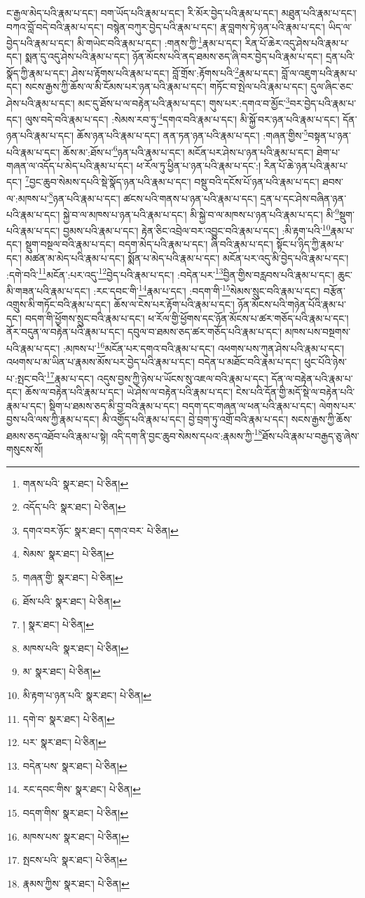 ང་རྒྱལ་མེད་པའི་རྣམ་པ་དང་། བག་ཡོད་པའི་རྣམ་པ་དང་། རི་མོར་བྱེད་པའི་རྣམ་པ་དང་། མཐུན་པའི་རྣམ་པ་དང་། བཀའ་བློ་བདེ་བའི་རྣམ་པ་དང་། བསྙེན་བཀུར་བྱེད་པའི་རྣམ་པ་དང་། རྣ་བླགས་ཏེ་ཉན་པའི་རྣམ་པ་དང་། ཡིད་ལ་བྱེད་པའི་རྣམ་པ་དང་། མི་གཡེང་བའི་རྣམ་པ་དང་། :གནས་ཀྱི་\footnote{གནས་པའི་  སྣར་ཐང་།  པེ་ཅིན། }རྣམ་པ་དང་། རིན་པོ་ཆེར་འདུ་ཤེས་པའི་རྣམ་པ་དང་། སྨན་དུ་འདུ་ཤེས་པའི་རྣམ་པ་དང་། ཉོན་མོངས་པའི་ནད་ཐམས་ཅད་ཞི་བར་བྱེད་པའི་རྣམ་པ་དང་། དྲན་པའི་སྣོད་ཀྱི་རྣམ་པ་དང་། ཤེས་པ་རྟོགས་པའི་རྣམ་པ་དང་། བློ་གྲོས་:རྟོགས་པའི་\footnote{འདོད་པའི་  སྣར་ཐང་།  པེ་ཅིན། }རྣམ་པ་དང་། བློ་ལ་འཇུག་པའི་རྣམ་པ་དང་། སངས་རྒྱས་ཀྱི་ཆོས་ལ་མི་ངོམས་པར་ཉན་པའི་རྣམ་པ་དང་། གཏོང་བ་སྤེལ་པའི་རྣམ་པ་དང་། དུལ་ཞིང་ཅང་ཤེས་པའི་རྣམ་པ་དང་། མང་དུ་ཐོས་པ་ལ་བརྟེན་པའི་རྣམ་པ་དང་། གུས་པར་:དགའ་བ་མྱོང་\footnote{དགའ་བར་ཉོང་  སྣར་ཐང་། དགའ་བར་  པེ་ཅིན། }བར་བྱེད་པའི་རྣམ་པ་དང་། ལུས་བདེ་བའི་རྣམ་པ་དང་། :སེམས་རབ་ཏུ་\footnote{སེམས་  སྣར་ཐང་།  པེ་ཅིན། }དགའ་བའི་རྣམ་པ་དང་། མི་སྐྱོ་བར་ཉན་པའི་རྣམ་པ་དང་། དོན་ཉན་པའི་རྣམ་པ་དང་། ཆོས་ཉན་པའི་རྣམ་པ་དང་། ནན་ཏན་ཉན་པའི་རྣམ་པ་དང་། :གཞན་གྱིས་\footnote{གཞན་གྱི་  སྣར་ཐང་།  པེ་ཅིན། }བསྟན་པ་ཉན་པའི་རྣམ་པ་དང་། ཆོས་མ་:ཐོས་པ་\footnote{ཐོས་པའི་  སྣར་ཐང་།  པེ་ཅིན། }ཉན་པའི་རྣམ་པ་དང་། མངོན་པར་ཤེས་པ་ཉན་པའི་རྣམ་པ་དང་། ཐེག་པ་གཞན་ལ་འདོད་པ་མེད་པའི་རྣམ་པ་དང་། ཕ་རོལ་ཏུ་ཕྱིན་པ་ཉན་པའི་རྣམ་པ་དང་:། རིན་པོ་ཆེ་ཉན་པའི་རྣམ་པ་དང་། \footnote{།    སྣར་ཐང་།  པེ་ཅིན། }བྱང་ཆུབ་སེམས་དཔའི་སྡེ་སྣོད་ཉན་པའི་རྣམ་པ་དང་། བསྡུ་བའི་དངོས་པོ་ཉན་པའི་རྣམ་པ་དང་། ཐབས་ལ་:མཁས་པ་\footnote{མཁས་པའི་  སྣར་ཐང་།  པེ་ཅིན། }ཉན་པའི་རྣམ་པ་དང་། ཚངས་པའི་གནས་པ་ཉན་པའི་རྣམ་པ་དང་། དྲན་པ་དང་ཤེས་བཞིན་ཉན་པའི་རྣམ་པ་དང་། སྐྱེ་བ་ལ་མཁས་པ་ཉན་པའི་རྣམ་པ་དང་། མི་སྐྱེ་བ་ལ་མཁས་པ་ཉན་པའི་རྣམ་པ་དང་། མི་\footnote{མ་  སྣར་ཐང་།  པེ་ཅིན། }སྡུག་པའི་རྣམ་པ་དང་། བྱམས་པའི་རྣམ་པ་དང་། རྟེན་ཅིང་འབྲེལ་བར་འབྱུང་བའི་རྣམ་པ་དང་། :མི་རྟག་པའི་\footnote{མི་རྟག་པ་ཉན་པའི་  སྣར་ཐང་།  པེ་ཅིན། }རྣམ་པ་དང་། སྡུག་བསྔལ་བའི་རྣམ་པ་དང་། བདག་མེད་པའི་རྣམ་པ་དང་། ཞི་བའི་རྣམ་པ་དང་། སྟོང་པ་ཉིད་ཀྱི་རྣམ་པ་དང་། མཚན་མ་མེད་པའི་རྣམ་པ་དང་། སྨོན་པ་མེད་པའི་རྣམ་པ་དང་། མངོན་པར་འདུ་མི་བྱེད་པའི་རྣམ་པ་དང་། :དགེ་བའི་\footnote{དགེ་བ་  སྣར་ཐང་།  པེ་ཅིན། }མངོན་:པར་འདུ་\footnote{པར་  སྣར་ཐང་།  པེ་ཅིན། }བྱེད་པའི་རྣམ་པ་དང་། :བདེན་པར་\footnote{བདེན་པས་  སྣར་ཐང་།  པེ་ཅིན། }བྱིན་གྱིས་བརླབས་པའི་རྣམ་པ་དང་། ཆུང་མི་གཟན་པའི་རྣམ་པ་དང་། :རང་དབང་གི་\footnote{རང་དབང་གིས་  སྣར་ཐང་།  པེ་ཅིན། }རྣམ་པ་དང་། :བདག་གི་\footnote{བདག་གིས་  སྣར་ཐང་།  པེ་ཅིན། }སེམས་སྲུང་བའི་རྣམ་པ་དང་། བརྩོན་འགྲུས་མི་གཏོང་བའི་རྣམ་པ་དང་། ཆོས་ལ་ངེས་པར་རྟོག་པའི་རྣམ་པ་དང་། ཉོན་མོངས་པའི་གཉེན་པོའི་རྣམ་པ་དང་། བདག་གི་ཕྱོགས་སྲུང་བའི་རྣམ་པ་དང་། ཕ་རོལ་གྱི་ཕྱོགས་དང་ཉོན་མོངས་པ་ཚར་གཅོད་པའི་རྣམ་པ་དང་། ནོར་བདུན་ལ་བརྟེན་པའི་རྣམ་པ་དང་། དབུལ་བ་ཐམས་ཅད་ཚར་གཅོད་པའི་རྣམ་པ་དང་། མཁས་པས་བསྔགས་པའི་རྣམ་པ་དང་། :མཁས་པ་\footnote{མཁས་པས་  སྣར་ཐང་།  པེ་ཅིན། }མངོན་པར་དགའ་བའི་རྣམ་པ་དང་། འཕགས་པས་ཀུན་ཤེས་པའི་རྣམ་པ་དང་། འཕགས་པ་མ་ཡིན་པ་རྣམས་མོས་པར་བྱེད་པའི་རྣམ་པ་དང་། བདེན་པ་མཐོང་བའི་རྣམ་པ་དང་། ཕུང་པོའི་ཉེས་པ་:སྤང་བའི་\footnote{སྤངས་པའི་  སྣར་ཐང་།  པེ་ཅིན། }རྣམ་པ་དང་། འདུས་བྱས་ཀྱི་ཉེས་པ་ཡོངས་སུ་འཇལ་བའི་རྣམ་པ་དང་། དོན་ལ་བརྟེན་པའི་རྣམ་པ་དང་། ཆོས་ལ་བརྟེན་པའི་རྣམ་པ་དང་། ཡེ་ཤེས་ལ་བརྟེན་པའི་རྣམ་པ་དང་། ངེས་པའི་དོན་གྱི་མདོ་སྡེ་ལ་བརྟེན་པའི་རྣམ་པ་དང་། སྡིག་པ་ཐམས་ཅད་མི་བྱ་བའི་རྣམ་པ་དང་། བདག་དང་གཞན་ལ་ཕན་པའི་རྣམ་པ་དང་། ལེགས་པར་བྱས་པའི་ལས་ཀྱི་རྣམ་པ་དང་། མི་འགྱོད་པའི་རྣམ་པ་དང་། བྱེ་བྲག་ཏུ་འགྲོ་བའི་རྣམ་པ་དང་། སངས་རྒྱས་ཀྱི་ཆོས་ཐམས་ཅད་འཐོབ་པའི་རྣམ་པ་སྟེ། འདི་དག་ནི་བྱང་ཆུབ་སེམས་དཔའ་:རྣམས་ཀྱི་\footnote{རྣམས་ཀྱིས་  སྣར་ཐང་།  པེ་ཅིན། }ཐོས་པའི་རྣམ་པ་བརྒྱད་ཅུ་ཞེས་གསུངས་སོ། 